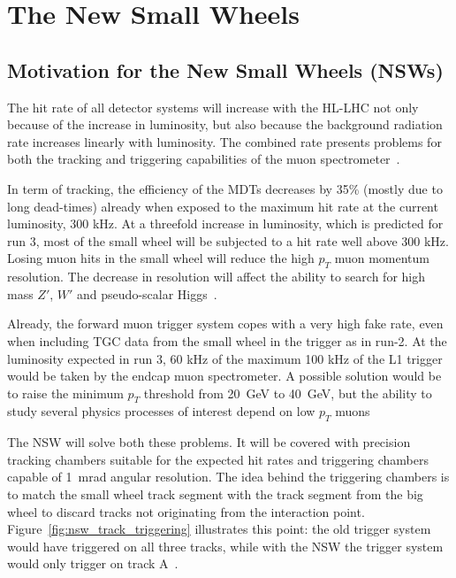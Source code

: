 
\chapter{The New Small Wheels}
\label{chap:nsw}

\section{Motivation for the New Small Wheels (NSWs)}

The hit rate of all detector systems will increase with the HL-LHC not only because of the increase in luminosity, but also because the background radiation rate increases linearly with luminosity.
The combined rate presents problems for both the tracking and triggering capabilities of the muon spectrometer~\cite{nsw_tdr}.

In term of tracking, the efficiency of the MDTs decreases by 35\% (mostly due to long dead-times) already when exposed to the maximum hit rate at the current luminosity, 300 kHz.
At a threefold increase in luminosity, which is predicted for run 3, most of the small wheel will be subjected to a hit rate well above 300 kHz. Losing muon hits in the small wheel will reduce the high $p_T$ muon momentum resolution. The decrease in resolution will affect the ability to search for high mass $Z'$, $W'$ and pseudo-scalar Higgs~\cite{nsw_tdr}.

Already, the forward muon trigger system copes with a very high fake rate, even when including TGC data from the small wheel in the trigger as in run-2. At the luminosity expected in run 3, 60 kHz of the maximum 100 kHz of the L1 trigger would be taken by the endcap muon spectrometer. A possible solution would be to raise the minimum $p_T$ threshold from \SI{20}{\giga\electronvolt} to \SI{40}{\giga\electronvolt}, but the ability to study several physics processes of interest depend on low $p_T$ muons~\cite{nsw_tdr}

The NSW will solve both these problems. It will be covered with precision tracking chambers suitable for the expected hit rates and triggering chambers capable of \SI{1}{mrad} angular resolution. The idea behind the triggering chambers is to match the small wheel track segment with the track segment from the big wheel to discard tracks not originating from the interaction point. Figure~\ref{fig:nsw_track_triggering} illustrates this point: the old trigger system would have triggered on all three tracks, while with the NSW the trigger system would only trigger on track A~\cite{nsw_tdr}.

